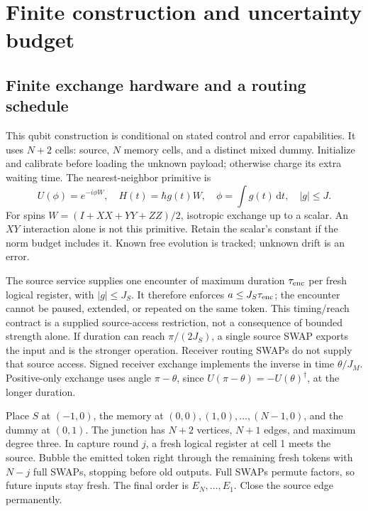 \documentclass[11pt]{article}
\numberwithin{equation}{section}
\theoremstyle{remark}
\newcommand{\dd}{\,\mathrm d}
\begin{document}
\section{Finite construction and uncertainty budget}
\label{sec:physical}
\subsection{Finite exchange hardware and a routing schedule}
This qubit construction is conditional on stated control and error
capabilities. It uses \(N+2\) cells: source, \(N\) memory cells, and a distinct
mixed dummy. Initialize and calibrate before loading the unknown payload;
otherwise charge its extra waiting time. The nearest-neighbor primitive is
\[
 U(\phi)=e^{-i\phi W},\quad H(t)=\hbar g(t)W,\quad
 \phi=\int g(t)\dd t,\quad |g|\le J.
\]
For spins \(W=(I+XX+YY+ZZ)/2\), isotropic exchange up to a scalar.
An \(XY\) interaction alone is not this primitive. Retain the scalar's
constant if the norm budget includes it. Known free evolution is tracked;
unknown drift is an error.

The source service supplies one encounter of maximum duration
\(\tau_{\rm enc}\) per fresh logical register, with \(|g|\le J_S\).
It therefore enforces \(a\le J_S\tau_{\rm enc}\); the encounter cannot be
paused, extended, or repeated on the same token. This timing/reach contract
is a supplied source-access restriction, not a consequence of bounded
strength alone. If duration can reach \(\pi/(2J_S)\), a single source SWAP
exports the input and is the stronger operation. Receiver routing SWAPs
do not supply that source access.
Signed receiver exchange implements the inverse in time \(\theta/J_M\).
Positive-only exchange uses angle \(\pi-\theta\), since
\(U(\pi-\theta)=-U(\theta)^\dagger\), at the longer duration.

Place \(S\) at \((-1,0)\), the memory at
\((0,0),(1,0),\ldots,(N-1,0)\), and the dummy at \((0,1)\).
The junction has \(N+2\) vertices, \(N+1\) edges, and maximum degree three.
In capture round \(j\), a fresh logical register at cell 1 meets the source.
Bubble the emitted token right through the remaining fresh tokens with
\(N-j\) full SWAPs, stopping before old outputs. Full SWAPs permute factors,
so future inputs stay fresh. The final order is \(E_N,\ldots,E_1\).
Close the source edge permanently.
\end{document}
